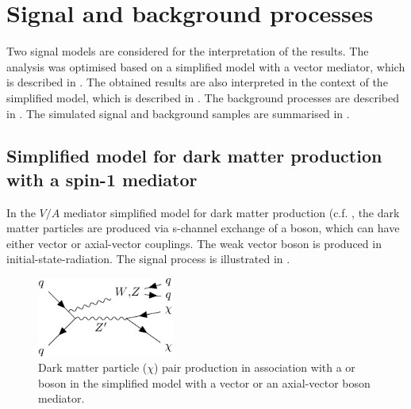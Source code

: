 \section{Signal and background processes}
\label{sec:monoV:physics}
Two signal models are considered for the interpretation of the results. The analysis was optimised based on a simplified model with a vector \PZprime mediator, which is described in . The obtained results are also interpreted in the context of the \ahdm simplified model, which is described in . The background processes are described in . The simulated signal and background samples are summarised in .

\subsection{Simplified model for dark matter production with a spin-1 \PZprime mediator}
\label{sec:monoV:physics:dmsimp}
In the \(V/A\) mediator simplified model for dark matter production (c.f. , the dark matter particles are produced via s-channel exchange of a \PZprime boson, which can have either vector or axial-vector couplings. The weak vector boson is produced in initial-state-radiation.
The signal process is illustrated in .

\begin{figure}[htbp]
	\centering
	\includegraphics[width=0.4\textwidth]{figures/monoV/physics/monoWZ.pdf}
	\caption{Dark matter particle (\(\chi\)) pair production in association with a \PW or \PZ boson in the simplified model with a vector or an axial-vector \PZprime boson mediator.}
	\label{fig:monoV:physics:dmsimp:graph}
\end{figure}

